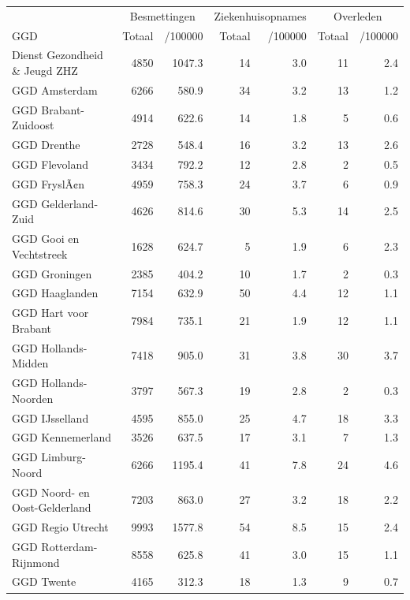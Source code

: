\documentclass[
  english,
  man,floatsintext]{apa6}
\begin{document}
\begin{table}
\centering\begingroup\fontsize{10}{12}\selectfont

\begin{threeparttable}
\begin{tabular}{lrrrrrr}
\toprule
\multicolumn{1}{c}{ } & \multicolumn{2}{c}{Besmettingen} & \multicolumn{2}{c}{Ziekenhuisopnames} & \multicolumn{2}{c}{Overleden} \\
\cmidrule(l{3pt}r{3pt}){2-3} \cmidrule(l{3pt}r{3pt}){4-5} \cmidrule(l{3pt}r{3pt}){6-7}
GGD & Totaal & /100000 & Totaal & /100000 & Totaal & /100000\\
\midrule
Dienst Gezondheid \& Jeugd ZHZ & 4850 & 1047.3 & 14 & 3.0 & 11 & 2.4\\
GGD Amsterdam & 6266 & 580.9 & 34 & 3.2 & 13 & 1.2\\
GGD Brabant-Zuidoost & 4914 & 622.6 & 14 & 1.8 & 5 & 0.6\\
GGD Drenthe & 2728 & 548.4 & 16 & 3.2 & 13 & 2.6\\
GGD Flevoland & 3434 & 792.2 & 12 & 2.8 & 2 & 0.5\\
GGD FryslÃ¢n & 4959 & 758.3 & 24 & 3.7 & 6 & 0.9\\
GGD Gelderland-Zuid & 4626 & 814.6 & 30 & 5.3 & 14 & 2.5\\
GGD Gooi en Vechtstreek & 1628 & 624.7 & 5 & 1.9 & 6 & 2.3\\
GGD Groningen & 2385 & 404.2 & 10 & 1.7 & 2 & 0.3\\
GGD Haaglanden & 7154 & 632.9 & 50 & 4.4 & 12 & 1.1\\
GGD Hart voor Brabant & 7984 & 735.1 & 21 & 1.9 & 12 & 1.1\\
GGD Hollands-Midden & 7418 & 905.0 & 31 & 3.8 & 30 & 3.7\\
GGD Hollands-Noorden & 3797 & 567.3 & 19 & 2.8 & 2 & 0.3\\
GGD IJsselland & 4595 & 855.0 & 25 & 4.7 & 18 & 3.3\\
GGD Kennemerland & 3526 & 637.5 & 17 & 3.1 & 7 & 1.3\\
GGD Limburg-Noord & 6266 & 1195.4 & 41 & 7.8 & 24 & 4.6\\
GGD Noord- en Oost-Gelderland & 7203 & 863.0 & 27 & 3.2 & 18 & 2.2\\
GGD Regio Utrecht & 9993 & 1577.8 & 54 & 8.5 & 15 & 2.4\\
GGD Rotterdam-Rijnmond & 8558 & 625.8 & 41 & 3.0 & 15 & 1.1\\
GGD Twente & 4165 & 312.3 & 18 & 1.3 & 9 & 0.7\\

\end{tabular}
\end{threeparttable}
\end{table}
\end{document}
